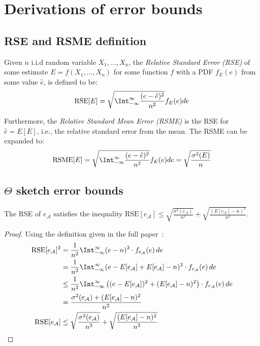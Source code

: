 \section{Derivations of error bounds}
\label{sec:appendix-error-bounds}

\subsection{RSE and RSME definition}
\label{ssec:RSE-RMSE}

Given $n$ i.i.d random variable $X_1, \dots , X_n$, the \emph{Relative Standard Error (RSE)}
of some estimate $E=f(X_1, \dots, X_n)$ for some function $f$ with a PDF $f_E(e)$ from some value $\hat{e}$, is defined to be:
\begin{align*}
    \text{RSE}[E]=\sqrt{\Int_{-\infty}^{\infty} \frac{(e-\hat{e})^2}{n^2}} f_E(e) de
\end{align*}

Furthermore, the \emph{Relative Standard Mean Error (RSME)} is the RSE for
$\hat{e}=E[E]$, i.e., the relative standard error from the mean. The RSME
can be expanded to:
\begin{align*}
    \text{RSME}[E]=\sqrt{\Int_{-\infty}^{\infty} \frac{(e-\hat{e})^2}{n^2}} f_E(e) de = \sqrt{\frac{\sigma^2(E)}{n}}
\end{align*}
\subsection{$\Theta$ sketch error bounds}
\label{ssec:theta-error-bounds}

\begin{lemma}
    The RSE of $e_{\mathcal{A}}$ satisfies the inequality $\text{RSE}[e_{\mathcal{A}}] \leq \sqrt{\frac{\sigma^2(e_{\mathcal{A}})}{n^2}} + \sqrt{\frac{(E[e_{\mathcal{A}}] - n)^2}{n^2}}$.
    \label{lemma:theta-adversary-bound}
\end{lemma}
\begin{proof}
    Using the definition given in the full paper~\cite{rinberg2019fast}:%
    \begin{align*}
    \begin{split}
    \text{RSE}[e_{\mathcal{A}}]^2 &= \frac{1}{n^2} \Int_{-\infty}^{\infty} (e - n)^2 \cdot f_{e_{\mathcal{A}}}(e) \,de \\
    &= \frac{1}{n^2} \Int_{-\infty}^{\infty} (e - E[e_{\mathcal{A}}] + E[e_{\mathcal{A}}] - n)^2 \cdot f_{e_{\mathcal{A}}}(e) \,de \\
    &\leq \frac{1}{n^2} \Int_{-\infty}^{\infty} \left((e - E[e_{\mathcal{A}}])^2 + (E[e_{\mathcal{A}}] - n)^2 \right)\cdot f_{e_{\mathcal{A}}}(e) \,de \\
    &= \frac{\sigma^2(e_{\mathcal{A}}) + (E[e_{\mathcal{A}}] - n)^2}{n^2} \\
    \text{RSE}[e_{\mathcal{A}}] &\leq \sqrt{\frac{\sigma^2(e_{\mathcal{A}})}{n^2}} + \sqrt{\frac{(E[e_{\mathcal{A}}] - n)^2}{n^2}}
    \end{split}
    \end{align*}
\end{proof}

